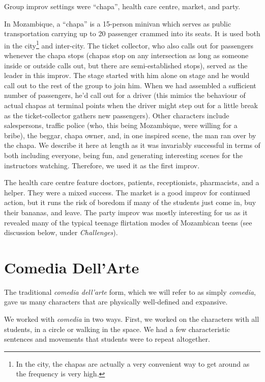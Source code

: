 \documentclass[article,twocolumn,twoside]{memoir}
\begin{document}
Group improv settings were ``chapa'', health care centre, market, and party.

In Mozambique, a ``chapa'' is a 15-person minivan which serves as public
transportation carrying up to 20 passenger crammed into its seats. It is used
both in the city\footnote{In the city, the chapas are actually a very
convenient way to get around as the frequency is very high.} and inter-city.
The ticket collector, who also calls out for passengers whenever the chapa
stops (chapas stop on any intersection as long as someone inside or outside
calls out, but there are semi-established stops), served as the leader in this
improv. The stage started with him alone on stage and he would call out to the
rest of the group to join him. When we had assembled a sufficient number of
passengers, he'd call out for a driver (this mimics the behaviour of actual
chapas at terminal points when the driver might step out for a little break as
the ticket-collector gathers new passengers). Other characters include
salespersons, traffic police (who, this being Mozambique, were willing for a
bribe), the beggar, chapa owner, and, in one inspired scene, the man ran over
by the chapa. We describe it here at length as it was invariably successful in
terms of both including everyone, being fun, and generating interesting scenes
for the instructors watching. Therefore, we used it as the first improv.

The health care centre feature doctors, patients, receptionists, pharmacists,
and a helper. They were a mixed success. The market is a good improv for
continued action, but it runs the risk of boredom if many of the students just
come in, buy their bananas, and leave. The party improv was mostly interesting
for us as it revealed many of the typical teenage flirtation modes of
Mozambican teens (see discussion below, under \emph{Challenges}).

\section{Comedia Dell'Arte}

The traditional \textit{comedia dell'arte} form, which we will refer to as
simply \textit{comedia}, gave us many characters that are physically
well-defined and expansive.

We worked with \textit{comedia} in two ways. First, we worked on the characters
with all students, in a circle or walking in the space. We had a few
characteristic sentences and movements that students were to repeat altogether.
\end{document}
